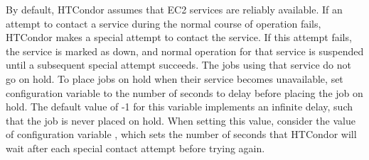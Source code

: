 By default, HTCondor assumes that EC2 services are reliably available.
If an attempt to contact a service during the normal course of operation fails,
HTCondor makes a special attempt to contact the service.
If this attempt fails, 
the service is marked as down,
and normal operation for that service is
suspended until a subsequent special attempt succeeds.  
The jobs using that service do not go on hold.
To place jobs on hold when their service becomes unavailable,
set configuration variable  to 
the number of seconds to delay before placing the job on hold.
The default value of -1 for this variable implements 
an infinite delay, such that the job is never placed on hold.
When setting this value, 
consider the value of configuration variable
,
which sets the number of seconds that HTCondor will wait after each
special contact attempt before trying again.
